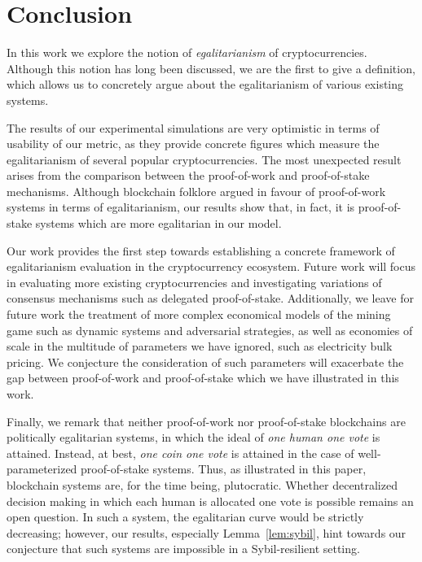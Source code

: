 \section{Conclusion}\label{sec:conclusion}

In this work we explore the notion of \emph{egalitarianism} of
cryptocurrencies. Although this notion has long been discussed, we are the first
to give a definition, which allows us to concretely argue about the
egalitarianism of various existing systems.

The results of our experimental simulations are very optimistic in
terms of usability of our metric, as they provide concrete figures
which measure the egalitarianism of several popular cryptocurrencies.
The most unexpected result arises from the comparison between the proof-of-work
and proof-of-stake mechanisms. Although blockchain folklore argued in favour of
proof-of-work systems in terms of egalitarianism,
our results show that, in fact, it is proof-of-stake systems which are more
egalitarian in our model.

Our work provides the first step towards establishing a concrete framework of
egalitarianism evaluation in the cryptocurrency ecosystem. Future work will
focus in evaluating more existing cryptocurrencies and
investigating variations of consensus mechanisms such as delegated
proof-of-stake. Additionally, we leave for future work the treatment of more
complex economical models
of the mining game such as dynamic systems and adversarial strategies, as well
as economies of scale in the multitude of parameters we have ignored, such as
electricity bulk pricing. We conjecture the consideration of such parameters
will exacerbate the gap between proof-of-work and proof-of-stake which we have
illustrated in this work.

Finally, we remark that neither proof-of-work nor proof-of-stake blockchains
are politically egalitarian systems, in which the ideal of
\emph{one human one vote} is attained. Instead, at best,
\emph{one coin one vote} is attained in the case of well-parameterized
proof-of-stake systems. Thus, as illustrated in this paper, blockchain systems are, for
the time being, plutocratic. Whether decentralized decision making in which
each human is allocated one vote is possible remains an open question.
In such a system, the egalitarian curve would be strictly
decreasing; however, our results, especially Lemma~\ref{lem:sybil}, hint towards our
conjecture that such systems are impossible in a Sybil-resilient setting.
